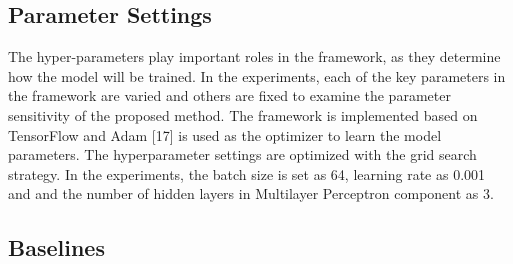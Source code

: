 \subsection{Parameter Settings}

The hyper-parameters play important roles in the framework, as they determine how the model will be
trained. In the experiments, each of the key parameters
in the framework are varied and others are fixed to examine the parameter sensitivity
of the proposed method. The framework is implemented based
on TensorFlow and Adam [17] is used as the optimizer to learn the
model parameters. The hyperparameter settings are optimized with
the grid search strategy. In the experiments, the batch size is set
as 64, learning rate as 0.001 and and the number of hidden layers in
Multilayer Perceptron component as 3.

\subsection{Baselines}


